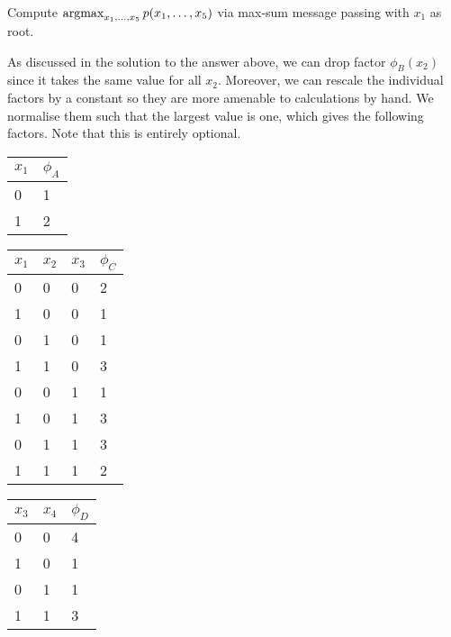 \begin{exenumerate}
\begin{solution}
    \end{solution}
  \item Compute $\operatorname*{\mathrm{argmax}}_{x_1, \ldots, x_5} p(x_1, \ldots, x_5)$ via max-sum message passing with $x_1$ as root.
    \label{q:x_1-root}
    \begin{solution}
      As discussed in the solution to the answer above, we can drop
      factor $\phi_B(x_2)$ since it takes the same value for all
      $x_2$. Moreover, we can rescale the individual factors by a
      constant so they are more amenable to calculations by hand. We
      normalise them such that the largest value is one, which gives
      the following factors. Note that this is entirely optional.
      \begin{center}
        \begin{tabular}{ll}
          \toprule
          $x_1$ & $\phi_A$\\
          \midrule
          0 & 1\\
          1 & 2\\
          \bottomrule
        \end{tabular}
        \hfill
        \begin{tabular}{llll}
          \toprule
          $x_1$ & $x_2$ & $x_3$ & $\phi_C$\\
          \midrule
          0 & 0 & 0 & 2 \\
          1 & 0 & 0 & 1 \\
          0 & 1 & 0 & 1 \\
          1 & 1 & 0 & 3 \\
          0 & 0 & 1 & 1 \\
          1 & 0 & 1 & 3 \\
          0 & 1 & 1 & 3 \\
          1 & 1 & 1 & 2 \\
          \bottomrule
        \end{tabular}
        \hfill
        \begin{tabular}{lll}
          \toprule
          $x_3$ & $x_4$ & $\phi_D$\\
          \midrule
          0 & 0 &  4 \\
          1 & 0 &  1 \\
          0 & 1 &  1 \\
          1 & 1 &  3 \\
          \bottomrule
        \end{tabular}
        \hfill
        \begin{tabular}{lll}
          \toprule

\end{tabular}
\end{center}
\end{solution}
\end{exenumerate}
